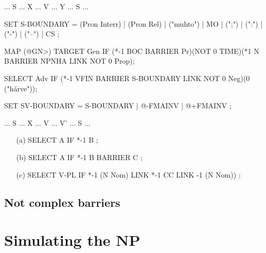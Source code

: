 \documentclass[landscape,english,11pt]{seminar}
\begin{document}
\begin{slide}
\newslide
\begin{example}\label{barrex}
... S ... X ... V ... Y ... S ... 
\end{example}



\newslide
\begin{example}\label{s}
SET S-BOUNDARY  = (Pron Interr) | (Pron Rel) | ("muhto") | MO | (";") | (":") | ("-") | ("–") | CS ;	
\end{example}



\newslide
\begin{example}
MAP (@GN>) TARGET Gen IF (*-1 BOC BARRIER Pr)(NOT 0 TIME)(*1 N BARRIER NPNHA LINK NOT 0 Prop);
\end{example}
\begin{example}
SELECT Adv IF (*-1 VFIN BARRIER S-BOUNDARY LINK NOT 0 Neg)(0 ("hárve"));
\end{example}


\newslide
\begin{example}\label{sv}
SET SV-BOUNDARY = S-BOUNDARY | @-FMAINV | @+FMAINV ;
\end{example}




\newslide
\begin{example}\label{svx}
... S ... X ... V ... V' ... S ...
\end{example}

\newslide
\begin{example}\label{ped}
\begin{itemize}
\item[(a)] SELECT A IF *-1 B ;
\item[(b)] SELECT A IF *-1 B BARRIER C ;
\item[(c)] SELECT V-PL IF *-1 (N Nom) LINK *-1 CC LINK -1 (N Nom)) ;
\end{itemize}
\end{example}




\newslide
\subsection{Not complex barriers}



\newslide
\section{Simulating the NP}




\end{slide}
\end{document}
